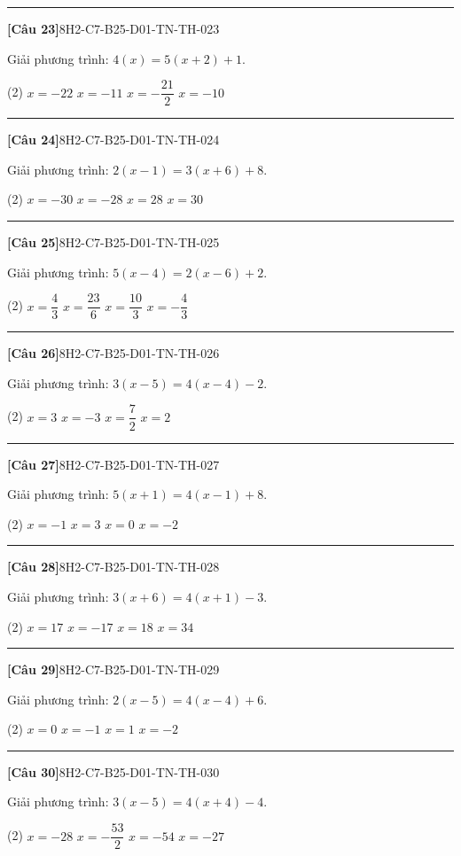 \documentclass[12pt,a4paper]{article}
\newif\ifloigiai
\newenvironment{cauhoi}[2]{%
  \par\medskip\noindent\rule{\textwidth}{0.4pt}\par\nopagebreak
  \noindent\textbf{[#1]}\hfill{\scriptsize\ttfamily #2}\par\nopagebreak\smallskip}{\par}
\newcommand{\dapan}[1]{\ifloigiai\par\smallskip\noindent\textit{Đáp án:} \textbf{#1}\par\fi}
\begin{document}
\begin{cauhoi}{Câu 23}{8H2-C7-B25-D01-TN-TH-023}
Giải phương trình: $4(x)=5(x + 2)+1$.
\begin{tasks}(2)
\task $x=-22$
\task $x=-11$
\task $x=-\dfrac{21}{2}$
\task $x=-10$
\end{tasks}
\dapan{B}
\end{cauhoi}
\begin{cauhoi}{Câu 24}{8H2-C7-B25-D01-TN-TH-024}
Giải phương trình: $2(x - 1)=3(x + 6)+8$.
\begin{tasks}(2)
\task $x=-30$
\task $x=-28$
\task $x=28$
\task $x=30$
\end{tasks}
\dapan{B}
\end{cauhoi}
\begin{cauhoi}{Câu 25}{8H2-C7-B25-D01-TN-TH-025}
Giải phương trình: $5(x - 4)=2(x - 6)+2$.
\begin{tasks}(2)
\task $x=\dfrac{4}{3}$
\task $x=\dfrac{23}{6}$
\task $x=\dfrac{10}{3}$
\task $x=-\dfrac{4}{3}$
\end{tasks}
\dapan{C}
\end{cauhoi}
\begin{cauhoi}{Câu 26}{8H2-C7-B25-D01-TN-TH-026}
Giải phương trình: $3(x - 5)=4(x - 4)-2$.
\begin{tasks}(2)
\task $x=3$
\task $x=-3$
\task $x=\dfrac{7}{2}$
\task $x=2$
\end{tasks}
\dapan{A}
\end{cauhoi}
\begin{cauhoi}{Câu 27}{8H2-C7-B25-D01-TN-TH-027}
Giải phương trình: $5(x + 1)=4(x - 1)+8$.
\begin{tasks}(2)
\task $x=-1$
\task $x=3$
\task $x=0$
\task $x=-2$
\end{tasks}
\dapan{A}
\end{cauhoi}
\begin{cauhoi}{Câu 28}{8H2-C7-B25-D01-TN-TH-028}
Giải phương trình: $3(x + 6)=4(x + 1)-3$.
\begin{tasks}(2)
\task $x=17$
\task $x=-17$
\task $x=18$
\task $x=34$
\end{tasks}
\dapan{A}
\end{cauhoi}
\begin{cauhoi}{Câu 29}{8H2-C7-B25-D01-TN-TH-029}
Giải phương trình: $2(x - 5)=4(x - 4)+6$.
\begin{tasks}(2)
\task $x=0$
\task $x=-1$
\task $x=1$
\task $x=-2$
\end{tasks}
\dapan{A}
\end{cauhoi}
\begin{cauhoi}{Câu 30}{8H2-C7-B25-D01-TN-TH-030}
Giải phương trình: $3(x - 5)=4(x + 4)-4$.
\begin{tasks}(2)
\task $x=-28$
\task $x=-\dfrac{53}{2}$
\task $x=-54$
\task $x=-27$
\end{tasks}
\dapan{D}
\end{cauhoi}
\end{document}
